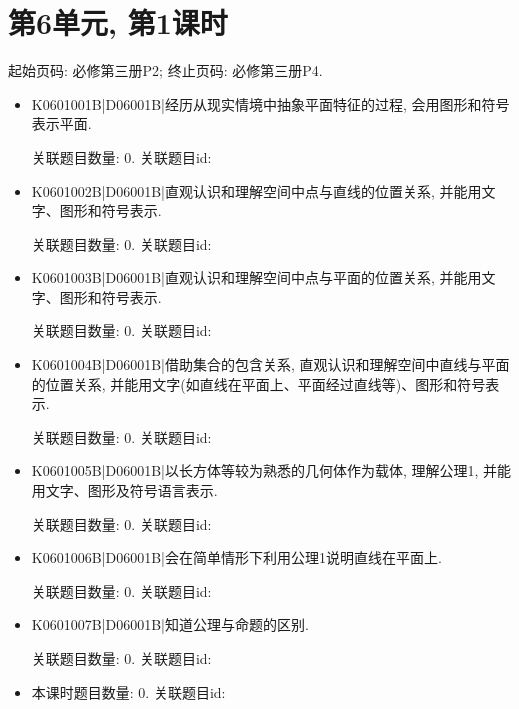 \section*{第6单元, 第1课时}
起始页码: 必修第三册P2; 终止页码: 必修第三册P4.
\begin{itemize}
\item K0601001B|D06001B|经历从现实情境中抽象平面特征的过程, 会用图形和符号表示平面.

关联题目数量: 0. 关联题目id: 

\item K0601002B|D06001B|直观认识和理解空间中点与直线的位置关系, 并能用文字、图形和符号表示.

关联题目数量: 0. 关联题目id: 

\item K0601003B|D06001B|直观认识和理解空间中点与平面的位置关系, 并能用文字、图形和符号表示.

关联题目数量: 0. 关联题目id: 

\item K0601004B|D06001B|借助集合的包含关系, 直观认识和理解空间中直线与平面的位置关系, 并能用文字(如直线在平面上、平面经过直线等)、图形和符号表示.

关联题目数量: 0. 关联题目id: 

\item K0601005B|D06001B|以长方体等较为熟悉的几何体作为载体, 理解公理1, 并能用文字、图形及符号语言表示.

关联题目数量: 0. 关联题目id: 

\item K0601006B|D06001B|会在简单情形下利用公理1说明直线在平面上.

关联题目数量: 0. 关联题目id: 

\item K0601007B|D06001B|知道公理与命题的区别.

关联题目数量: 0. 关联题目id: 

\item 本课时题目数量: 0. 关联题目id: 

\end{itemize}

